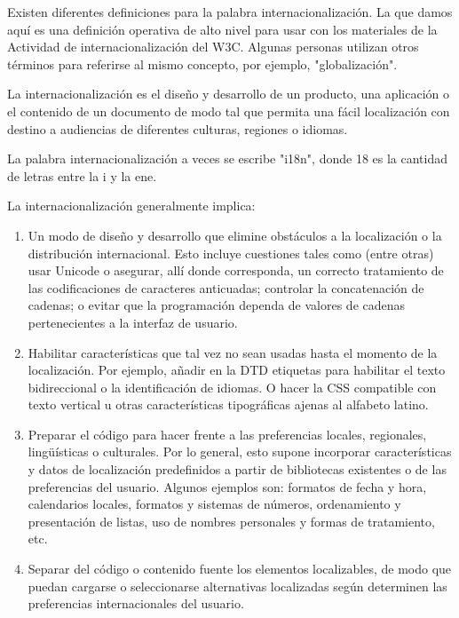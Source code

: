 \begin{enumerate}
Existen diferentes definiciones para la palabra internacionalización. La que damos aquí es una definición operativa de alto nivel para usar con los materiales de la Actividad de internacionalización del W3C. Algunas personas utilizan otros términos para referirse al mismo concepto, por ejemplo, "globalización".

La internacionalización es el diseño y desarrollo de un producto, una aplicación o el contenido de un documento de modo tal que permita una fácil localización con destino a audiencias de diferentes culturas, regiones o idiomas.
\begin{remark}
	La palabra internacionalización a veces se escribe "i18n", donde 18 es la cantidad de letras entre la i y la ene.
\end{remark}

La internacionalización generalmente implica:

\begin{enumerate}
	\item Un modo de diseño y desarrollo que elimine obstáculos a la localización o la distribución internacional. Esto incluye cuestiones tales como (entre otras) usar Unicode o asegurar, allí donde corresponda, un correcto tratamiento de las codificaciones de caracteres anticuadas; controlar la concatenación de cadenas; o evitar que la programación dependa de valores de cadenas pertenecientes a la interfaz de usuario.
	\item Habilitar características que tal vez no sean usadas hasta el momento de la localización. Por ejemplo, añadir en la DTD etiquetas para habilitar el texto bidireccional o la identificación de idiomas. O hacer la CSS compatible con texto vertical u otras características tipográficas ajenas al alfabeto latino.
	\item Preparar el código para hacer frente a las preferencias locales, regionales, lingüísticas o culturales. Por lo general, esto supone incorporar características y datos de localización predefinidos a partir de bibliotecas existentes o de las preferencias del usuario. Algunos ejemplos son: formatos de fecha y hora, calendarios locales, formatos y sistemas de números, ordenamiento y presentación de listas, uso de nombres personales y formas de tratamiento, etc.
	\item Separar del código o contenido fuente los elementos localizables, de modo que puedan cargarse o seleccionarse alternativas localizadas según determinen las preferencias internacionales del usuario.
\end{enumerate}


\end{enumerate}
